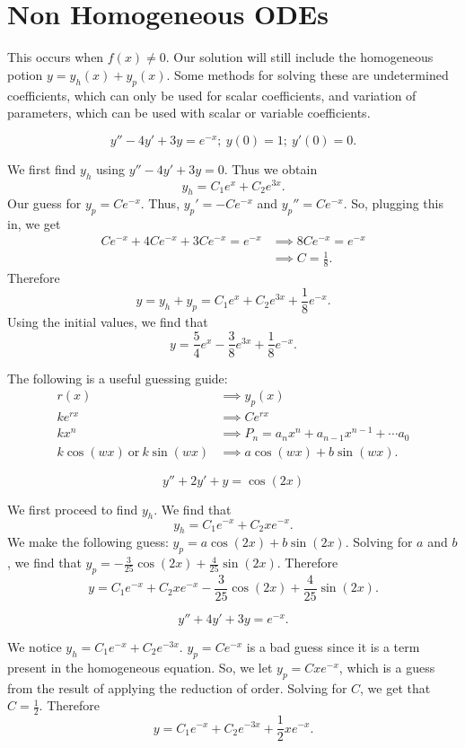 \section{Non Homogeneous ODEs}
This occurs when $f(x) \neq 0$.
Our solution will still include the homogeneous potion
$y = y_h(x) + y_p(x)$. Some methods for solving these are
\alert{undetermined coefficients}, which can only be used for scalar coefficients,
and \alert{variation of parameters}, which can be used with scalar or variable 
coefficients.
\newpage
\begin{example}
    $$y''-4y' + 3y = e^{-x};~y(0) = 1;~y'(0)=0.$$
\end{example}
\begin{soln}
    We first find $y_h$ using $y''-4y'+3y = 0$. Thus we obtain
    $$y_h = C_1e^x+C_2e^{3x}.$$ Our guess for $y_p = Ce^{-x}$.
    Thus, $y_p' = -Ce^{-x}$ and $y_p'' = Ce^{-x}$. So, plugging this in,
    we get 
    \begin{align*}
        Ce^{-x}+4Ce^{-x}+3Ce^{-x} = e^{-x} &\implies 8Ce^{-x} = e^{-x} \\
                                           &\implies C = \frac{1}{8}.
    \end{align*}
    Therefore $$y = y_h + y_p = C_1e^{x}+C_2e^{3x} + \frac{1}{8}e^{-x}.$$
    Using the initial values, we find that
    $$\boxed{y = \frac{5}{4}e^{x}-\frac{3}{8}e^{3x} + \frac{1}{8}e^{-x}}.$$
\end{soln}
The following is a useful guessing guide:
\begin{align*}
    r(x) &\implies y_p(x) \\
    ke^{rx} &\implies Ce^{rx} \\
    kx^n &\implies P_n = a_nx^n + a_{n-1}x^{n-1} + \cdots a_0 \\
    k\cos(wx)~\text{or}~k\sin(wx) &\implies a\cos(wx)+b\sin(wx).
\end{align*}
\begin{example}
   $$ y''+2y'+y = \cos(2x)$$
\end{example}
\begin{soln}
    We first proceed to find $y_h$. We find that
    $$y_h = C_1e^{-x}+C_2xe^{-x}.$$
    We make the following guess: $y_p = a\cos(2x) + b\sin(2x)$. Solving
    for $a$ and $b$, we find that $y_p = -\frac{3}{25}\cos(2x) + \frac{4}{25}\sin(2x)$.
    Therefore 
    $$\boxed{y = C_1e^{-x}+C_2xe^{-x} - \frac{3}{25}\cos(2x)+\frac{4}{25}\sin(2x)}.$$
\end{soln}
\begin{example}
    $$y''+4y'+3y = e^{-x}.$$
\end{example}
\begin{soln}
    We notice $y_h = C_1e^{-x} + C_2e^{-3x}$. $y_p = Ce^{-x}$ is a bad guess since it is a term present in the
    homogeneous equation. So, we let $y_p = Cxe^{-x}$, which is a guess from
    the result of applying the reduction of order. Solving for $C$, we get
    that $C = \frac{1}{2}$. Therefore 
    $$\boxed{y = C_1e^{-x}+C_2e^{-3x}+\frac{1}{2}xe^{-x}}.$$
\end{soln}

